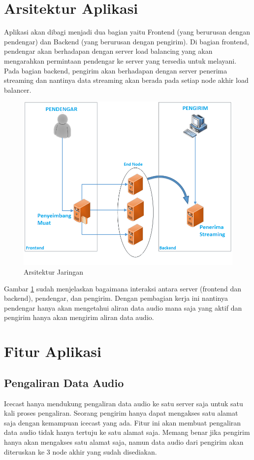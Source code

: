 \documentclass[oneside]{book}
\begin{document}
	\section{Arsitektur Aplikasi}
	
	Aplikasi akan dibagi menjadi dua bagian yaitu Frontend (yang berurusan dengan pendengar) dan Backend (yang berurusan dengan pengirim). Di bagian frontend, pendengar akan berhadapan dengan server load balancing yang akan mengarahkan permintaan pendengar ke server yang tersedia untuk melayani. Pada bagian backend, pengirim akan berhadapan dengan server penerima streaming dan nantinya data streaming akan berada pada setiap node akhir load balancer. 
	
	\begin{figure}
		\centering
		\includegraphics[width=0.5\linewidth]{arsitektur}
		\caption{Arsitektur Jaringan}
		\label{fig:arsitektur}
	\end{figure}
	
	Gambar \ref{fig:arsitektur} sudah menjelaskan bagaimana interaksi antara server (frontend dan backend), pendengar, dan pengirim. Dengan pembagian kerja ini nantinya pendengar hanya akan mengetahui aliran data audio mana saja yang aktif dan pengirim hanya akan mengirim aliran data audio.

	\section{Fitur Aplikasi}
	\subsection{Pengaliran Data Audio}
	
	Icecast hanya mendukung pengaliran data audio ke satu server saja untuk satu kali proses pengaliran. Seorang pengirim hanya dapat mengakses satu alamat saja dengan kemampuan icecast yang ada. Fitur ini akan membuat pengaliran data audio tidak hanya tertuju ke satu alamat saja. Memang benar jika pengirim hanya akan mengakses satu alamat saja, namun data audio dari pengirim akan diteruskan ke 3 node akhir yang sudah disediakan.
	
\end{document}
